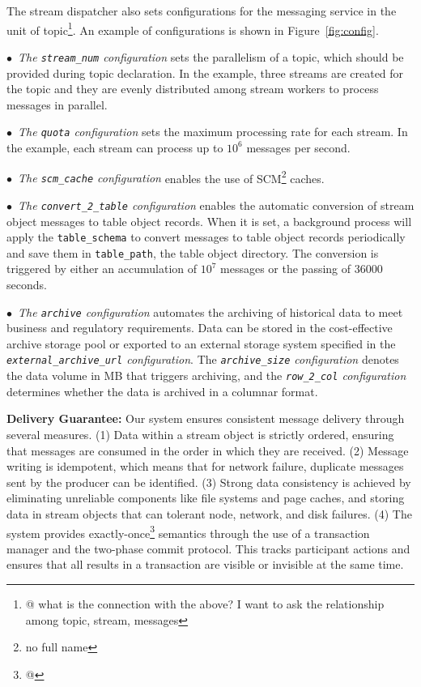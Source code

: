 The stream dispatcher also sets configurations for the messaging service in the unit of topic\footnote{@ what is the connection with the above? I want to ask the relationship among topic, stream, messages}. An example of  configurations is shown in Figure~\ref{fig:config}.



$\bullet$~\textit{The \texttt{stream\_num} configuration} sets the parallelism of a topic, which should be provided during topic declaration. In the example, three streams are created for the topic and they are evenly distributed among stream workers to process messages in parallel.

$\bullet$~\textit{The \texttt{quota} configuration} sets the maximum processing rate for each stream. In the example, each stream can process up to $10^6$ messages per second.

$\bullet$~\textit{The \texttt{scm\_cache} configuration} enables the use of SCM\footnote{no full name} caches.

$\bullet$~\textit{The \texttt{convert\_2\_table} configuration} enables the automatic conversion of stream object messages to table object records. When it is set, a background process will apply the \texttt{table\_schema} to convert messages to table object records periodically and save them in \texttt{table\_path}, \ie the table object directory. The conversion is triggered by either an accumulation of $10^7$ messages or the passing of 36000 seconds.

$\bullet$~\textit{The \texttt{archive} configuration} automates the archiving of historical data to meet business and regulatory requirements. Data can be stored in the cost-effective \sys archive storage pool or exported to an external storage system specified in the \textit{\texttt{external\_archive\_url} configuration}. The \textit{\texttt{archive\_size} configuration} denotes the data volume in MB that triggers archiving, and the \textit{\texttt{row\_2\_col} configuration} determines whether the data is archived in a columnar format.


\noindent\textbf{Delivery Guarantee:} Our system ensures consistent message delivery through several measures. (1) Data within a stream object is strictly ordered, ensuring that messages are consumed in the order in which they are received. (2) Message writing is idempotent, which means that for network failure, duplicate messages sent by the producer  can be identified.
 (3) Strong data consistency is achieved by eliminating unreliable components like file systems and page caches, and storing data in  stream objects that can tolerant node, network, and disk failures. (4) The system provides exactly-once\footnote{@} semantics through the use of a transaction manager and the two-phase commit protocol. This tracks participant actions and ensures that all results in a transaction are visible or invisible at the same time.
 
